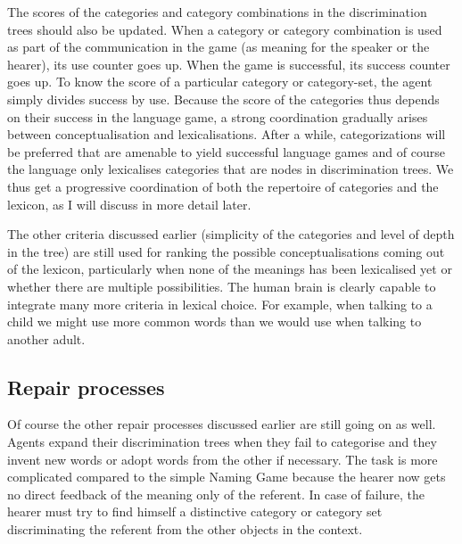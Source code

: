 The scores of the categories and category
combinations in the discrimination trees should also 
be updated. When a category or category combination
is used as part of the communication 
in the game (as meaning for the speaker or
the hearer), its use counter goes up. When 
the game is successful, its success counter 
goes up. To know the score of a particular 
category or category-set, the agent simply 
divides success by use. Because the score of the categories 
thus depends on their success in the 
language game, a strong coordination gradually 
arises between conceptualisation and 
lexicalisations. After a while, categorizations
will be preferred that are amenable to yield
successful language games and of course the 
language only lexicalises categories that are 
nodes in discrimination trees. 
We thus get a progressive coordination of 
both the repertoire of categories and the 
lexicon, as I will discuss in more detail later. 

The other criteria discussed earlier (simplicity of 
the categories and level of depth in the tree) are 
still used for ranking the possible conceptualisations
coming out of the lexicon, particularly when none
of the meanings has been lexicalised yet or whether
there are multiple possibilities. The human brain 
is clearly capable to integrate many more criteria
in lexical choice. For example, when talking to a 
child we might use more common words than we would use 
when talking to another adult. 

\subsection{Repair processes}

Of course the other repair processes discussed earlier 
are still going on as well. Agents expand their 
discrimination trees when they fail to categorise and 
they invent new words or adopt words from the 
other if necessary. The task is more complicated compared
to the simple Naming Game because the hearer now gets
no direct feedback of the meaning only of the referent. 
In case of failure, the hearer must try to find himself a distinctive
category or category set discriminating the 
referent from the other objects in the context.

